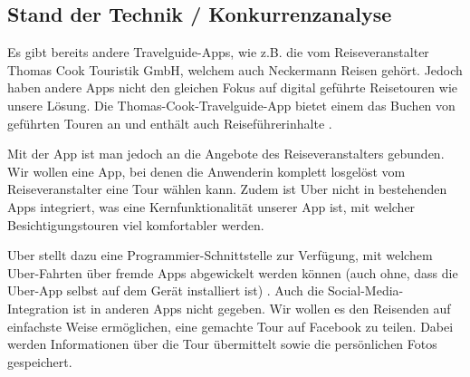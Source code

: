 \subsection{Stand der Technik / Konkurrenzanalyse}\label{StandTechnik}
Es gibt bereits andere Travelguide-Apps, wie z.B. die vom Reiseveranstalter Thomas Cook
Touristik GmbH, welchem auch Neckermann Reisen gehört. Jedoch haben andere Apps nicht den
gleichen Fokus auf digital geführte Reisetouren wie unsere Lösung. Die Thomas-Cook-Travelguide-App
bietet einem das Buchen von geführten Touren an und enthält auch Reiseführerinhalte \cite{TomasCookApp}.

Mit der App ist man jedoch an die Angebote des Reiseveranstalters gebunden. Wir wollen eine
App, bei denen die Anwenderin komplett losgelöst vom Reiseveranstalter eine Tour wählen kann.
Zudem ist Uber nicht in bestehenden Apps integriert, was eine Kernfunktionalität unserer
App ist, mit welcher Besichtigungstouren viel komfortabler werden.

Uber stellt dazu eine Programmier-Schnittstelle zur Verfügung, mit welchem Uber-Fahrten
über fremde Apps abgewickelt werden können (auch ohne, dass die Uber-App selbst auf dem
Gerät installiert ist) \cite{UberApi}. Auch die Social-Media-Integration ist in anderen Apps
nicht gegeben. Wir wollen es den Reisenden auf einfachste Weise ermöglichen, eine gemachte
Tour auf Facebook zu teilen. Dabei werden Informationen über die Tour übermittelt sowie die
persönlichen Fotos gespeichert.

